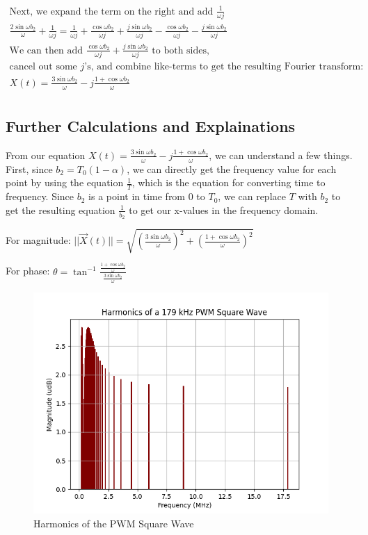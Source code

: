 \documentclass{article}
\begin{document}
\begin{gather*}
\text{Next, we expand the term on the right and add $\frac{1}{\omega{j}}$} \\
\frac{2\sin{\omega{b_2}}}{\omega}+\frac{1}{\omega{j}} = \frac{1}{\omega{j}} + \frac{\cos{\omega{b_2}}}{\omega{j}}+\frac{j\sin{\omega{b_2}}}{\omega{j}}-\frac{\cos{\omega{b_2}}}{\omega{j}}-\frac{j\sin{\omega{b_2}}}{\omega{j}} \\
\text{We can then add $\frac{\cos{\omega{b_2}}}{\omega{j}}+\frac{j\sin{\omega{b_2}}}{\omega{j}}$ to both sides,} \\
\text{cancel out some $j$'s, and combine like-terms to get the resulting Fourier transform:} \\
X(t) = \frac{3\sin{\omega{b_2}}}{\omega}-j\frac{1+\cos{\omega{b_2}}}{\omega} \\
\end{gather*}

\subsection{Further Calculations and Explainations}

From our equation $X(t) = \frac{3\sin{\omega{b_2}}}{\omega}-j\frac{1+\cos{\omega{b_2}}}{\omega}$, we can understand a few things.
First, since $b_2 = T_0(1-\alpha)$, we can directly get the frequency value for each point by using the equation $\frac{1}{T}$, which is the equation
for converting time to frequency. Since $b_2$ is a point in time from $0$ to $T_0$, we can replace $T$ with $b_2$ to get the resulting equation $\frac{1}{b_2}$ to get our x-values in the frequency domain.

\vspace{5mm}

For magnitude: $||\vec{X}(t)|| = \sqrt{{(\frac{3\sin{\omega{b_2}}}{\omega})}^2+{(\frac{1+\cos{\omega{b_2}}}{\omega})}^2}$

\vspace{5mm}

For phase: $\theta = \tan^{-1}{\frac{\frac{1+\cos{\omega{b_2}}}{\omega}}{\frac{3\sin{\omega{b_2}}}{\omega}}}$

\begin{figure}[h]
\includegraphics[scale=.70]{harmonics.png}
\caption{Harmonics of the PWM Square Wave}
\end{figure}
\end{document}
